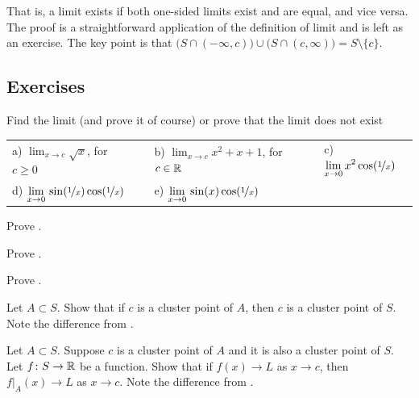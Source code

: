 That is, a limit exists if both one-sided limits exist and are equal, and
vice versa.  The
proof is a straightforward application of the definition of limit
and is left as an exercise.  The key point is that
$\bigl( S \cap (-\infty,c) \bigr) \cup \bigl( S \cap (c,\infty) \bigr)
= S \setminus \{ c \}$.

\subsection{Exercises}

\begin{exercise}
Find the limit (and prove it of course) or prove that the limit does not exist

\medskip

\noindent
\begin{tabular}{lllll}
a)
$\displaystyle
\lim_{x\to c} \sqrt{x}
$, for $c \geq 0$
& &
b)
$\displaystyle
\lim_{x\to c} x^2+x+1
$, for $c \in {\mathbb{R}}$
& &
c)
$\displaystyle
\lim_{x\to 0} x^2 \cos (\nicefrac{1}{x})
$
\\
d)
$\displaystyle
\lim_{x\to 0}\, \sin(\nicefrac{1}{x}) \cos (\nicefrac{1}{x})
$
& &
e)
$\displaystyle
\lim_{x\to 0}\, \sin(x) \cos (\nicefrac{1}{x})
$ & 
\end{tabular}
\end{exercise}

\begin{exercise}
Prove .
\end{exercise}

\begin{exercise}
Prove .
\end{exercise}

\begin{exercise}
Prove .
\end{exercise}

\begin{exercise}
Let $A \subset S$.  Show that if $c$ is a cluster point of $A$, then $c$
is a cluster point of $S$.  Note the difference from
.
\end{exercise}

\begin{exercise} \label{exercise:restrictionlimitexercise}
Let $A \subset S$.  Suppose $c$ is a cluster point of $A$ and
it is also a cluster point of $S$.
Let $f \colon S \to {\mathbb{R}}$ be a function.  Show that if
$f(x) \to L$ as $x \to c$, then
$f|_A(x) \to L$ as $x \to c$.
Note the difference from
.
\end{exercise}

